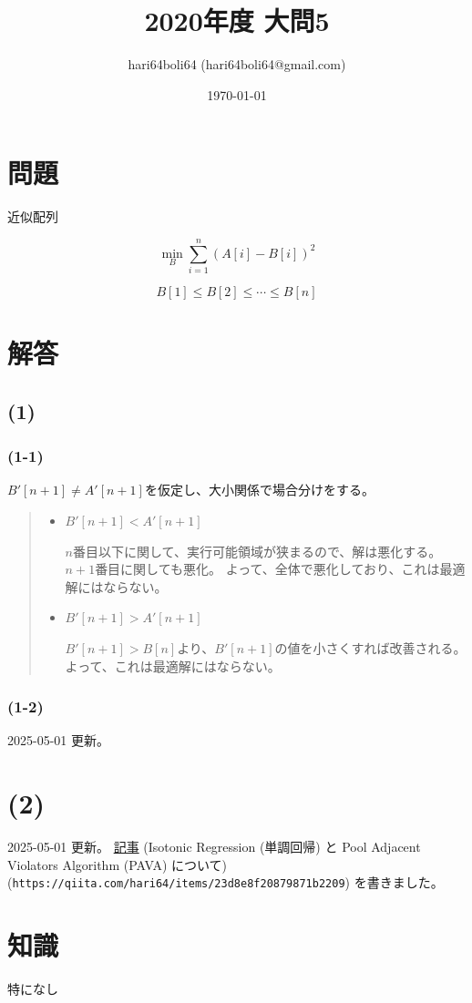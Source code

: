 \documentclass[a4paper, 10pt, dvipdfmx]{jlreq}
\begin{document}
\title{2020年度 大問5}
\author{hari64boli64 (hari64boli64@gmail.com)}
\date{\today}
\maketitle


\section{問題}

近似配列

\begin{equation*}
  \min_{B} \sum_{i=1}^{n}{(A[i]-B[i])^2}
\end{equation*}

$$
  B[1]\leq B[2] \leq \cdots \leq B[n]
$$

\section{解答}

\subsection*{(1)}

\subsubsection*{(1-1)}

$B'[n+1] \neq A'[n+1]$を仮定し、大小関係で場合分けをする。

\begin{quote}
  \begin{itemize}
    \item  $B'[n+1] < A'[n+1]$

          $n$番目以下に関して、実行可能領域が狭まるので、解は悪化する。
          $n+1$番目に関しても悪化。
          よって、全体で悪化しており、これは最適解にはならない。

    \item  $B'[n+1] > A'[n+1]$

          $B'[n+1]>B[n]$より、$B'[n+1]$の値を小さくすれば改善される。
          よって、これは最適解にはならない。
  \end{itemize}
\end{quote}


\subsubsection*{(1-2)}

2025-05-01 更新。

\section*{(2)}

2025-05-01 更新。 \href{https://qiita.com/hari64/items/23d8e8f20879871b2209}{記事} (Isotonic Regression (単調回帰) と Pool Adjacent Violators Algorithm (PAVA) について) (\texttt{https://qiita.com/hari64/items/23d8e8f20879871b2209}) を書きました。

\section{知識}

特になし
\end{document}
